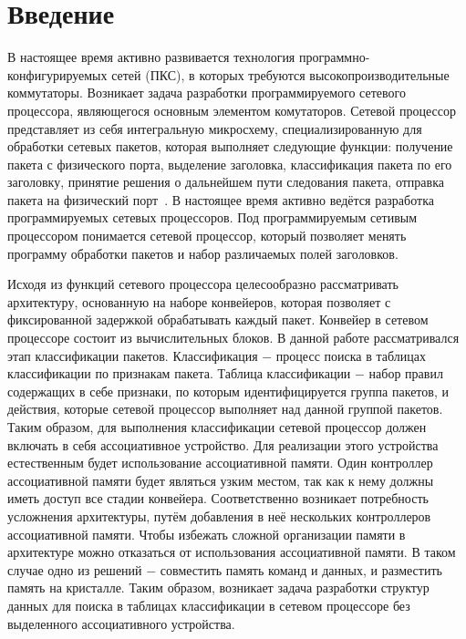 \documentclass[a4peper, 12pt, titlepage, finall]{report}
\begin{document}
        
    \newpage
    \tableofcontents
    \newpage

    \chapter*{Введение}
         В настоящее время активно развивается технология программно-конфигурируемых сетей (ПКС), в которых требуются высокопроизводительные 
        коммутаторы. Возникает задача разработки программируемого сетевого процессора, являющегося основным элементом комутаторов. Сетевой процессор 
        представляет из себя интегральную микросхему, специализированную для обработки сетевых пакетов, которая выполняет следующие функции:
        получение пакета с физического порта, выделение заголовка,
        классификация пакета по его заголовку, принятие решения о дальнейшем пути следования пакета, отправка пакета на физический порт~\cite{chao2007high:1}.
        В настоящее время активно ведётся разработка программируемых сетевых процессоров. Под программируемым сетивым процессором
        понимается сетевой процессор, который позволяет менять программу обработки пакетов и набор различаемых полей заголовков.
        
        Исходя из функций сетевого процессора целесообразно рассматривать архитектуру, основанную на
        наборе конвейеров, которая позволяет с фиксированной задержкой обрабатывать каждый пакет. 
        Конвейер в сетевом процессоре состоит из вычислительных блоков. В данной работе рассматривался этап классификации пакетов. Классификация $-$ процесс поиска в таблицах классификации
        по признакам пакета. Таблица классификации $-$ набор правил содержащих в себе признаки, по которым идентифицируется группа пакетов,
        и действия, которые сетевой процессор выполняет над данной группой пакетов. 
        Таким образом, для выполнения классификации сетевой процессор должен включать в себя ассоциативное устройство. Для реализации этого устройства естественным будет использование 
        ассоциативной памяти. Один контроллер ассоциативной памяти будет являться узким местом, так как к нему должны иметь доступ все стадии конвейера.
        Соответственно возникает потребность усложнения архитектуры, путём добавления в неё нескольких контроллеров ассоциативной памяти.
        Чтобы избежать сложной организации памяти в архитектуре можно отказаться от использования ассоциативной памяти. 
        В таком случае одно из решений $-$ совместить память команд и данных, и разместить память на кристалле.
        Таким образом, возникает задача разработки структур данных для поиска в таблицах классификации в сетевом процессоре без выделенного ассоциативного устройства.
 
\end{document}
